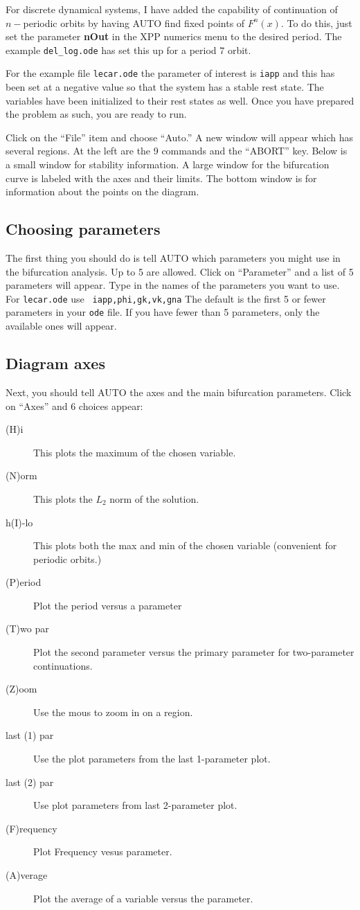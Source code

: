 \documentclass{article}
\begin{document}
For discrete dynamical systems, I have added the capability of
continuation of $n-$periodic orbits by having AUTO find fixed points
of $F^n(x).$ To do this, just set the parameter {\bf nOut} in the XPP
numerics menu to the desired period. The example {\tt del\_log.ode} has
set this up for a period 7 orbit.

For the example file {\tt lecar.ode} the parameter
of interest is {\tt iapp} and this has been set at a negative value so
that the system has a stable rest state.  The variables have been
initialized to their rest states as well.  Once you have prepared the
problem as such, you are ready to run.

Click on the ``File'' item and choose ``Auto.''  A new window will
appear which has several regions.  At the left are the 9 commands and
the ``ABORT'' key.  Below is a small window for stability information.
A large window for the bifurcation curve is labeled with the axes and
their limits.  The bottom window is for information about the points
on the diagram.

\subsection{Choosing parameters}

The first thing you should do is tell AUTO which parameters you might
use in the bifurcation analysis. Up to 5 are allowed.  Click on
``Parameter'' and a list of 5 parameters will appear.  Type in the
names of the parameters you want to use.  For {\tt lecar.ode} use {\tt
iapp,phi,gk,vk,gna}  The default is the first 5 or fewer parameters
in your {\tt ode} file. If you have fewer than 5 parameters, only the
available ones will appear.
\subsection{Diagram axes}

Next, you should tell AUTO the axes and the main bifurcation
parameters.  Click on ``Axes'' and 6 choices appear:
\begin{description}
\item[(H)i] This plots the maximum of the chosen variable.
\item[(N)orm]  This plots the $L_2$ norm of the solution.
\item[h(I)-lo] This plots both the max and min of the chosen variable
(convenient for periodic orbits.)
\item[(P)eriod] Plot the period versus a parameter
\item[(T)wo par] Plot the second parameter versus the primary
parameter for two-parameter continuations.
\item[(Z)oom] Use the mous to zoom in on a region.
\item[last (1) par] Use the plot parameters from the last 1-parameter
plot.
\item[last (2) par] Use plot parameters from last 2-parameter plot.
\item[(F)requency ] Plot Frequency vesus parameter.
\item[(A)verage ] Plot the average of a variable versus the parameter.
\end{description}
\end{document}
